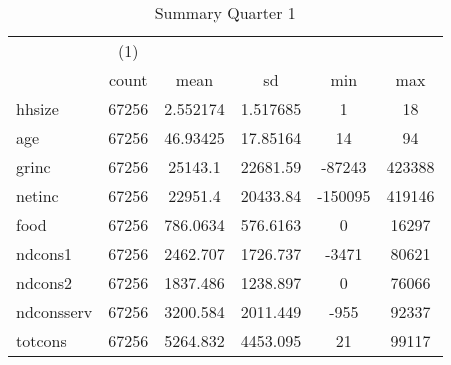 \begin{table}[htbp]\centering
\def\sym#1{\ifmmode^{#1}\else\(^{#1}\)\fi}
\caption{Summary Quarter 1 \label{sum\_Q1}}
\begin{tabular}{l*{1}{ccccc}}
\hline\hline
            &\multicolumn{1}{c}{(1)}&            &            &            &            \\
            &       count&        mean&          sd&         min&         max\\
\hline
hhsize      &       67256&    2.552174&    1.517685&           1&          18\\
age         &       67256&    46.93425&    17.85164&          14&          94\\
grinc       &       67256&     25143.1&    22681.59&      -87243&      423388\\
netinc      &       67256&     22951.4&    20433.84&     -150095&      419146\\
food        &       67256&    786.0634&    576.6163&           0&       16297\\
ndcons1     &       67256&    2462.707&    1726.737&       -3471&       80621\\
ndcons2     &       67256&    1837.486&    1238.897&           0&       76066\\
ndconsserv  &       67256&    3200.584&    2011.449&        -955&       92337\\
totcons     &       67256&    5264.832&    4453.095&          21&       99117\\
\hline\hline
\end{tabular}
\end{table}
